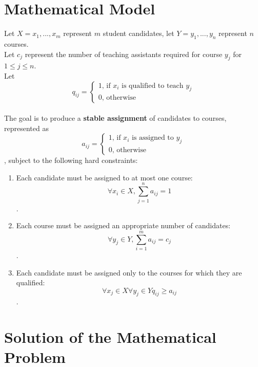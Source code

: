\documentclass[twoside,twocolumn]{article}
\begin{document}
    \section{Mathematical Model}
    Let $X = {x_1,...,x_m}$ represent $m$ student candidates, let $Y = {y_1,...,y_n}$ represent $n$ courses. \\
    Let $c_j$ represent the number of teaching assistants required for course $y_j$ for $1 \leq j \leq n$. \\
    Let $$q_{ij} = \begin{cases}1\text{, if $x_i$ is qualified to teach $y_j$} \\ 0\text{, otherwise} \end{cases}$$ \\
    The goal is to produce a \textbf{stable assignment} of candidates to courses, represented as 
    $$a_{ij} = \begin{cases}1\text{, if $x_i$ is assigned to $y_j$} \\ 0\text{, otherwise} \end{cases}$$, 
    subject to the following hard constraints:
    \begin{enumerate}
        \item Each candidate must be assigned to at most one course: $$\forall x_i \in X, \sum_{j = 1}^n a_{ij} = 1$$.
        \item Each course must be assigned an appropriate number of candidates: $$\forall y_j \in Y, \sum_{i = 1}^m a_{ij} = c_j$$.
        \item Each candidate must be assigned only to the courses for which they are qualified: $$\forall x_j \in X \forall y_j \in Y q_{ij} \geq a_{ij}$$.
    \end{enumerate}
    \section{Solution of the Mathematical Problem}
\end{document}
